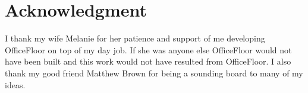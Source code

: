 \documentclass[prodmode]{style/acmlarge}
\begin{document}
\section*{Acknowledgment} I thank my wife Melanie for her patience and support
of me developing OfficeFloor on top of my day job.  If she was anyone else
OfficeFloor would not have been built and this work would not have resulted from
OfficeFloor.  I also thank my good friend Matthew Brown for being a sounding
board to many of my ideas.




\end{document}
